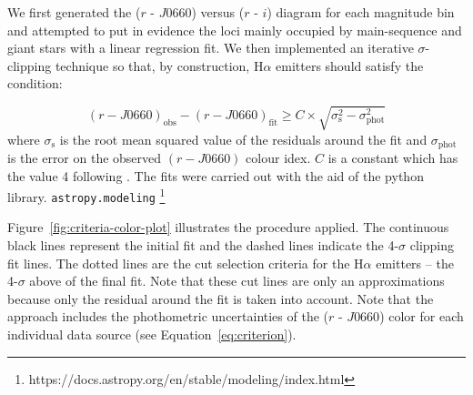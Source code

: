 \documentclass[fleqn,usenatbib]{mnras}
\newcommand{\comment}[1]{\textcolor{red}{#1}}
\newcommand{\luis}[1]{\textcolor{magenta}{#1}}
\begin{document}
We first generated the ($r$ - $J0660$) versus ($r$ - $i$)
diagram for each magnitude bin and attempted to put in evidence the loci mainly 
occupied by main-sequence and giant stars with a linear regression fit. 
We then implemented an iterative $\sigma$-clipping technique so that, by construction, H$\alpha$ emitters should satisfy the condition: %

\begin{equation}
  (r - J0660)_{\mathrm{obs}} - (r - J0660)_{\mathrm{fit}} \geq C \times \sqrt{\sigma^2_{\mathrm{s}} - \sigma^2_{\mathrm{phot}}}
  \label{eq:criterion}
\end{equation}
 where $\sigma_{\mathrm{s}}$ is the root mean squared value of the residuals around
 the fit and $\sigma_{\mathrm{phot}}$ is the error on the observed $(r - J0660)$ colour idex.
 $C$ is a constant which has the value 4 following \citet{Wevers:2017}.
The fits were carried out with the aid of the python library. \texttt{astropy.modeling}
\footnote{https://docs.astropy.org/en/stable/modeling/index.html}

Figure~\ref{fig:criteria-color-plot} illustrates the procedure applied. The continuous black lines represent the initial
fit and  the dashed lines indicate the 4-$\sigma$ clipping fit lines. The dotted lines are
the cut selection criteria for the H{$\alpha$} emitters -- the 4-$\sigma$ above of the final
fit. Note that these cut lines are only an approximations because only the residual around the fit is taken into account. 
Note that the approach includes the phothometric uncertainties of the ($r$ - $J0660$) color for each
individual data source (see Equation~\ref{eq:criterion}).
\end{document}
